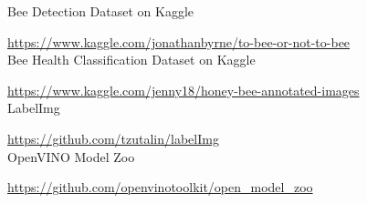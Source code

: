 \documentclass[a4paper,titlepage]{article}
\begin{document}
Bee Detection Dataset on Kaggle

\href{https://www.kaggle.com/jonathanbyrne/to-bee-or-not-to-bee}{https://www.kaggle.com/jonathanbyrne/to-bee-or-not-to-bee} \\

Bee Health Classification Dataset on Kaggle

\href{https://www.kaggle.com/jenny18/honey-bee-annotated-images}{https://www.kaggle.com/jenny18/honey-bee-annotated-images} \\

LabelImg

\href{https://github.com/tzutalin/labelImg}{https://github.com/tzutalin/labelImg} \\

OpenVINO Model Zoo

\href{https://github.com/openvinotoolkit/open_model_zoo}{https://github.com/openvinotoolkit/open\_model\_zoo} \\
\end{document}
